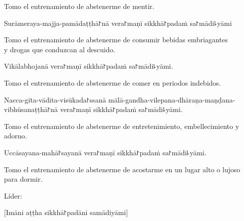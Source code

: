 \begin{english}
  Tomo el entrenamiento de abstenerme de mentir.
\end{english}

\begin{precept}
  \setcounter{enumi}{4}
  \item Surāmeraya-majja-pamādaṭṭhā꜓nā vera꜓maṇī sikkhā꜓padaṁ sa꜓mādi꜕yāmi
\end{precept}

\begin{english}
  Tomo el entrenamiento de abstenerme de consumir bebidas embriagantes\\
  y drogas que conduzcan al descuido.
\end{english}

\begin{precept}
  \setcounter{enumi}{5}
  \item Vikālabhojanā vera꜓maṇī sikkhā꜓padaṁ sa꜓mādi꜕yāmi.
\end{precept}

\begin{english}
  Tomo el entrenamiento de abstenerme de comer en periodos indebidos.
\end{english}

\begin{precept}
  \setcounter{enumi}{6}
  \item Nacca-gīta-vādita-visūkada꜓ssanā mālā-gandha-vilepana-dhāraṇa-maṇḍana-vibhūsanaṭṭhā꜓nā vera꜓maṇī sikkhā꜓padaṁ sa꜓mādi꜕yāmi.
\end{precept}

\begin{english}
  Tomo el entrenamiento de abstenerme de entretenimiento, embellecimiento y adorno.
\end{english}

\begin{precept}
  \setcounter{enumi}{7}
  \item Uccāsayana-mahā꜓sayanā vera꜓maṇī sikkhā꜓padaṁ sa꜓mādi꜕yāmi.
\end{precept}

\begin{english}
  Tomo el entrenamiento de abstenerme de acostarme en un lugar alto o lujoso para dormir.
\end{english}

\begin{instruction}
	Líder:
\end{instruction}

[Imāni aṭṭha sikkhā꜓padāni samādiyāmi]\\

